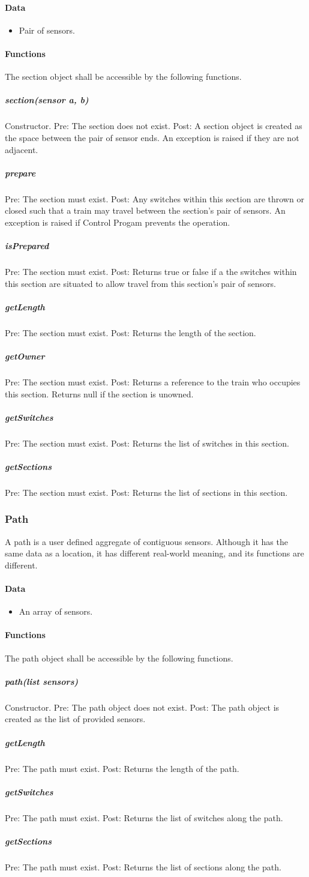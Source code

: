 \documentclass[a4paper,11pt,notitlepage]{article}
\def\CS{Control Progam\xspace}
\begin{document}
\paragraph{Data}
\begin{itemize}
\item Pair of sensors.
\end{itemize}
\paragraph{Functions}
The section object shall be accessible by the following functions.
\subparagraph{section(sensor a, b)} Constructor. Pre: The section does not exist. Post: A section object is created as the space between the pair of sensor ends. An exception is raised if they are not adjacent.
\subparagraph{prepare} Pre: The section must exist. Post: Any switches within this section are thrown or closed such that a train may travel between the section's pair of sensors. An exception is raised if \CS prevents the operation.
\subparagraph{isPrepared} Pre: The section must exist. Post: Returns true or false if a the switches within this section are situated to allow travel from this section's pair of sensors.
\subparagraph{getLength} Pre: The section must exist. Post: Returns the length of the section.
\subparagraph{getOwner} Pre: The section must exist. Post: Returns a reference to the train who occupies this section. Returns null if the section is unowned.
\subparagraph{getSwitches} Pre: The section must exist. Post: Returns the list of switches in this section.
\subparagraph{getSections} Pre: The section must exist. Post: Returns the list of sections in this section.

\subsubsection{Path}
A path is a user defined aggregate of contiguous sensors. Although it has the same data as a location, it has different real-world meaning, and its functions are different.
\paragraph{Data}
\begin{itemize}
\item An array of sensors.
\end{itemize}
\paragraph{Functions}
The path object shall be accessible by the following functions.
\subparagraph{path(list sensors)} Constructor. Pre: The path object does not exist. Post: The path object is created as the list of provided sensors.
\subparagraph{getLength} Pre: The path must exist. Post: Returns the length of the path.
\subparagraph{getSwitches} Pre: The path must exist.  Post: Returns the list of switches along the path.
\subparagraph{getSections} Pre: The path must exist.  Post: Returns the list of sections along the path.
\end{document}
